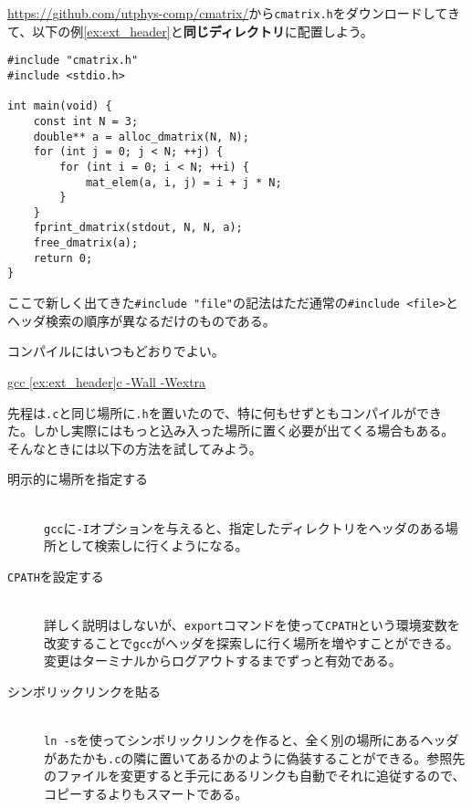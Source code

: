 \url{https://github.com/utphys-comp/cmatrix/}から\texttt{cmatrix.h}をダウンロードしてきて、以下の例\ref{ex:ext_header}と\textbf{同じディレクトリ}に配置しよう。

\begin{reidai}\label{ex:ext_header}
    \begin{verbatim}
#include "cmatrix.h"
#include <stdio.h>

int main(void) {
    const int N = 3;
    double** a = alloc_dmatrix(N, N);
    for (int j = 0; j < N; ++j) {
        for (int i = 0; i < N; ++i) {
            mat_elem(a, i, j) = i + j * N;
        }
    }
    fprint_dmatrix(stdout, N, N, a);
    free_dmatrix(a);
    return 0;
}
\end{verbatim}
\end{reidai}
ここで新しく出てきた\texttt{\#include "file"}の記法はただ通常の\texttt{\#include <file>}とヘッダ検索の順序が異なるだけのものである。

コンパイルにはいつもどおりでよい。

\begin{commandline2}
    \prompt \underline{gcc \ref{ex:ext_header}c -Wall -Wextra}
\end{commandline2} \noindent

先程は\texttt{.c}と同じ場所に\texttt{.h}を置いたので、特に何もせずともコンパイルができた。しかし実際にはもっと込み入った場所に置く必要が出てくる場合もある。
そんなときには以下の方法を試してみよう。
\begin{description}
    \item[明示的に場所を指定する]\mbox{}\\
          \texttt{gcc}に\texttt{-I}オプションを与えると、指定したディレクトリをヘッダのある場所として検索しに行くようになる。
    \item[\texttt{CPATH}を設定する]\mbox{}\\
          詳しく説明はしないが、\texttt{export}コマンドを使って\texttt{CPATH}という環境変数を改変することで\texttt{gcc}がヘッダを探索しに行く場所を増やすことができる。変更はターミナルからログアウトするまでずっと有効である。
    \item[シンボリックリンクを貼る]\mbox{}\\
          \texttt{ln -s}を使ってシンボリックリンクを作ると、全く別の場所にあるヘッダがあたかも\texttt{.c}の隣に置いてあるかのように偽装することができる。参照先のファイルを変更すると手元にあるリンクも自動でそれに追従するので、コピーするよりもスマートである。
\end{description}

